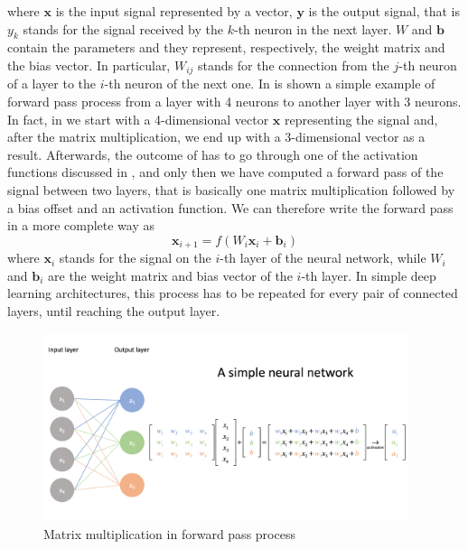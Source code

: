 \documentclass[12pt,a4paper]{report}
\theoremstyle{definition}
\begin{document}
where $\textbf{x}$ is the input signal represented by a vector, $\textbf{y}$ is the output signal, that is $y_k$ stands for the signal received by the $k$-th neuron in the next layer.
$W$ and $\textbf{b}$ contain the parameters and they represent, respectively, the weight matrix and the bias vector.
In particular, $W_{ij}$ stands for the connection from the $j$-th neuron of a layer to the $i$-th neuron of the next one.
In  is shown a simple example of forward pass process from a layer with 4 neurons to another layer with 3 neurons.
In fact, in  we start with a 4-dimensional vector $\mathbf{x}$ representing the signal and, after the matrix multiplication, we end up with a 3-dimensional vector as a result.
Afterwards, the outcome of  has to go through one of the activation functions discussed in , and only then we have computed a forward pass of the signal between two layers, that is basically one matrix multiplication followed by a bias offset and an activation function.
We can therefore write the forward pass in a more complete way as
\begin{equation*}
    \mathbf{x}_{i+1} = f\left( W_i \mathbf{x}_i + \mathbf{b}_i \right)
\end{equation*}
where $\mathbf{x}_i$ stands for the signal on the $i$-th layer of the neural network, while $W_i$ and $\mathbf{b}_i$ are the weight matrix and bias vector of the $i$-th layer.
In simple deep learning architectures, this process has to be repeated for every pair of connected layers, until reaching the output layer.

\begin{figure}
    \centering
    \includegraphics[width=0.95\textwidth, trim={0 1.5cm 0 4.8cm},clip]{./Images/Matrix representation.png}
    \caption{Matrix multiplication in forward pass process}
    \label{fig:matrix_multiplication}
\end{figure}
\end{document}
